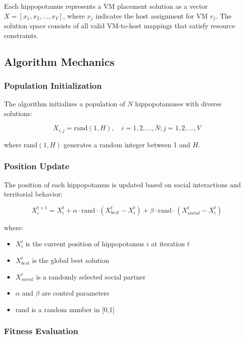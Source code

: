 \documentclass[conference]{IEEEtran}
\begin{document}
Each hippopotamus represents a VM placement solution as a vector $X = [x_1, x_2, ..., x_V]$, where $x_j$ indicates the host assignment for VM $v_j$. The solution space consists of all valid VM-to-host mappings that satisfy resource constraints.

\subsection{Algorithm Mechanics}

\subsubsection{Population Initialization}

The algorithm initializes a population of $N$ hippopotamuses with diverse solutions:

\begin{equation}
X_{i,j} = \text{rand}(1, H), \quad i = 1,2,...,N; j = 1,2,...,V
\end{equation}

where $\text{rand}(1, H)$ generates a random integer between 1 and $H$.

\subsubsection{Position Update}

The position of each hippopotamus is updated based on social interactions and territorial behavior:

\begin{equation}
X_i^{t+1} = X_i^t + \alpha \cdot \text{rand} \cdot (X_{best}^t - X_i^t) + \beta \cdot \text{rand} \cdot (X_{social}^t - X_i^t)
\end{equation}

where:
\begin{itemize}
    \item $X_i^t$ is the current position of hippopotamus $i$ at iteration $t$
    \item $X_{best}^t$ is the global best solution
    \item $X_{social}^t$ is a randomly selected social partner
    \item $\alpha$ and $\beta$ are control parameters
    \item $\text{rand}$ is a random number in [0,1]
\end{itemize}

\subsubsection{Fitness Evaluation}
\end{document}
